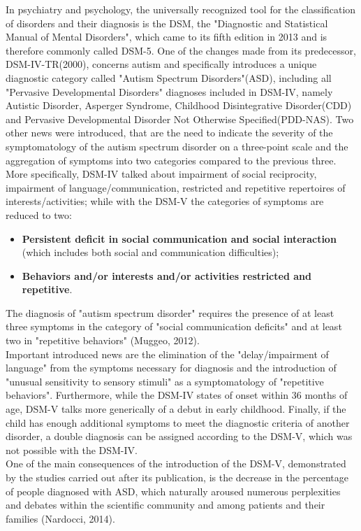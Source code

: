 In psychiatry and psychology, the universally recognized tool for the classification of disorders and their diagnosis is the DSM, the "Diagnostic and Statistical Manual of Mental Disorders", which came to its fifth edition in 2013 and is therefore commonly called DSM-5. One of the changes made from its predecessor, DSM-IV-TR(2000), concerns autism and specifically introduces a unique diagnostic category called "Autism Spectrum Disorders"(ASD), including all "Pervasive Developmental Disorders" diagnoses included in DSM-IV, namely Autistic Disorder, Asperger Syndrome, Childhood Disintegrative Disorder(CDD) and Pervasive Developmental Disorder Not Otherwise Specified(PDD-NAS).
Two other news were introduced, that are the need to indicate the severity of the symptomatology of the autism spectrum disorder on a three-point scale and the aggregation of symptoms into two categories compared to the previous three. More specifically, DSM-IV talked about impairment of social reciprocity, impairment of language/communication, restricted and repetitive repertoires of interests/activities; while with the DSM-V the categories of symptoms are reduced to two:
\begin{itemize}
	\item \textbf{Persistent deficit in social communication and social interaction} (which includes both social and communication difficulties);
	\item \textbf{Behaviors and/or interests and/or activities restricted and repetitive}.
\end{itemize}
The diagnosis of "autism spectrum disorder" requires the presence of at least three symptoms in the category of "social communication deficits" and at least two in "repetitive behaviors" (Muggeo, 2012).\\
Important introduced news are the elimination of the "delay/impairment of language" from the symptoms necessary for diagnosis and the introduction of "unusual sensitivity to sensory stimuli" as a symptomatology of "repetitive behaviors".
Furthermore, while the DSM-IV states of onset within 36 months of age, DSM-V talks more generically of a debut in early childhood. Finally, if the child has enough additional symptoms to meet the diagnostic criteria of another disorder, a double diagnosis can be assigned according to the DSM-V, which was not possible with the DSM-IV.\\
One of the main consequences of the introduction of the DSM-V, demonstrated by the studies carried out after its publication, is the decrease in the percentage of people diagnosed with ASD, which naturally aroused numerous perplexities and debates within the scientific community and among patients and their families (Nardocci, 2014).\\

